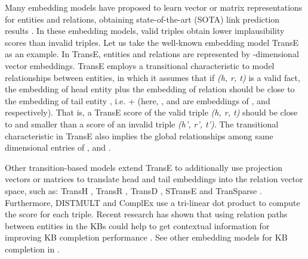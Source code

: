 \documentclass[11pt,a4paper]{article}
\begin{document}
Many embedding models have proposed to learn vector or matrix representations for entities and relations, obtaining state-of-the-art (SOTA) link prediction results \cite{NickelMTG15}. In these embedding models, valid triples obtain lower implausibility scores than invalid triples.
Let us take the well-known embedding model TransE \citep{NIPS2013_5071} as an example. In TransE,  entities and relations are represented by -dimensional vector embeddings.  
TransE employs a transitional characteristic to model relationships between entities, in which it assumes that  if \textit{(h, r, t)} is a valid fact, the embedding of head entity  plus the embedding of relation  should be close to the embedding of tail entity , i.e.  +   
 (here, ,  and  are embeddings of ,  and  respectively). That is, a TransE score  of the valid  triple \textit{(h, r, t)}  should be close to   and  smaller than a score  of an invalid  triple \textit{(h', r', t')}. 
The  transitional characteristic in TransE  also implies the global relationships among same dimensional entries of ,  and .

Other  transition-based models extend TransE 
to additionally use projection vectors or matrices to translate head and tail embeddings into the relation vector space,  such as: TransH \citep{AAAI148531}, TransR \citep{AAAI159571}, TransD \citep{ji-EtAl:2015:ACL-IJCNLP}, STransE \citep{NguyenNAACL2016}  and TranSparse \citep{JiLH016}. 
Furthermore, DISTMULT \citep{Yang2015} and ComplEx \citep{Trouillon2016} use a tri-linear dot product to compute the score for each triple.  
Recent research has shown that using relation paths between entities in the KBs could help to get contextual information for improving  KB completion performance \citep{lin-EtAl:2015:EMNLP1,luo-EtAl:2015:EMNLP3,guu2015traversing,Toutanova2016,Nguyen2016}.  See other embedding models for KB completion in \citet{Nguyen2017}.
\end{document}
